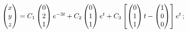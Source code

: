 \begin{enumsolsfull}
		\item \( \begin{pmatrix} x \\ y \\ z \end{pmatrix} = C_1 \begin{pmatrix} 0 \\ 2 \\ 1 \end{pmatrix} e^{-3t} + C_2 \begin{pmatrix} 0 \\ 1 \\ 1 \end{pmatrix} e^{t} + C_3 \left[ \begin{pmatrix} 0 \\ 1 \\ 1 \end{pmatrix} t - \begin{pmatrix} 1 \\ 0 \\ 0 \end{pmatrix} \right] e^{t} \); %

\end{enumsolsfull}
